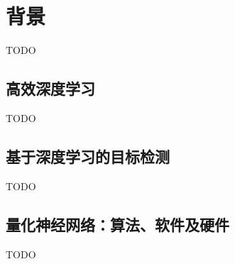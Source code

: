 \chapter{背景}
TODO

\section{高效深度学习}
TODO

\section{基于深度学习的目标检测}
TODO

\section{量化神经网络：算法、软件及硬件}
TODO
